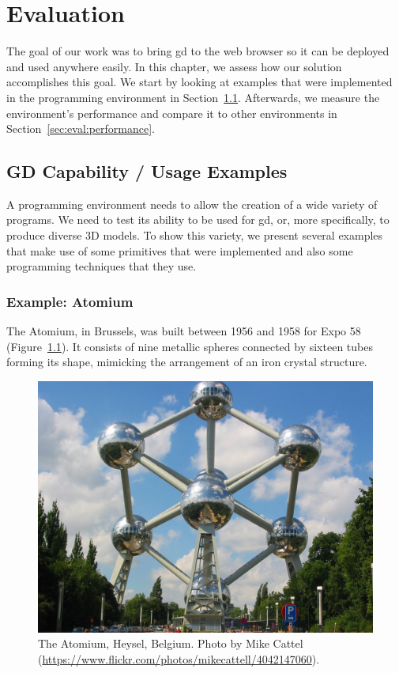 
\chapter{Evaluation}
\label{chapter:evaluation}
The goal of our work was to bring \gls{gd} to the web browser so it can be deployed and used anywhere easily.
In this chapter, we assess how our solution accomplishes this goal.
We start by looking at examples that were implemented in the programming environment in Section~\ref{sec:eval:gd:capable}.
Afterwards, we measure the environment's performance and compare it to other environments in Section~\ref{sec:eval:performance}.


\section{GD Capability / Usage Examples}
\label{sec:eval:gd:capable}
A programming environment needs to allow the creation of a wide variety of programs.
We need to test its ability to be used for \gls{gd}, or, more specifically, to produce diverse 3D models.
To show this variety, we present several examples that make use of some primitives that were implemented and also some programming techniques that they use.



\subsection{Example: Atomium}
The Atomium, in Brussels, was built between 1956 and 1958 for Expo 58 (Figure~\ref{fig:atomium:photo}).
It consists of nine metallic spheres connected by sixteen tubes forming its shape, mimicking the arrangement of an iron crystal structure.

\begin{figure}
  \centering
  \includegraphics[width=0.6\linewidth]{./images/atomium_photo}
  \caption[The Atomium in Brussels.]{The Atomium, Heysel, Belgium. Photo by Mike Cattel (\url{https://www.flickr.com/photos/mikecattell/4042147060}).}
  \label{fig:atomium:photo}
\end{figure}


